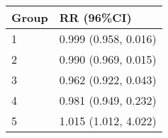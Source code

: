 \begin{tabular}{ll}
  \hline
Group & RR (96\%CI) \\ 
  \hline
   1 & 0.999 (0.958, 0.016) \\ 
     2 & 0.990 (0.969, 0.015) \\ 
     3 & 0.962 (0.922, 0.043) \\ 
     4 & 0.981 (0.949, 0.232) \\ 
     5 & 1.015 (1.012, 4.022) \\ 
   \hline
\end{tabular}

